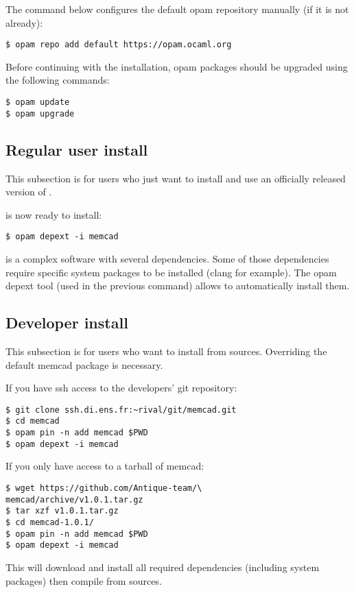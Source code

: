 The command below configures the default opam repository manually
(if it is not already):
\begin{verbatim}
$ opam repo add default https://opam.ocaml.org
\end{verbatim}

Before continuing with the installation, opam packages should be upgraded
using the following commands:
\begin{verbatim}
$ opam update
$ opam upgrade
\end{verbatim}

\subsection{Regular user install}
This subsection is for users who just want to install and use
an officially released version of \memcad.

\memcad is now ready to install:
\begin{verbatim}
$ opam depext -i memcad
\end{verbatim}

\memcad is a complex software with several dependencies.
Some of those dependencies require specific system packages
to be installed (clang for example).
The opam depext tool (used in the previous command) allows
to automatically install them.

\subsection{Developer install}
This subsection is for users who want to install \memcad from sources.
Overriding the default memcad package is necessary.

If you have ssh access to the developers' git repository:
\begin{verbatim}
$ git clone ssh.di.ens.fr:~rival/git/memcad.git
$ cd memcad
$ opam pin -n add memcad $PWD
$ opam depext -i memcad
\end{verbatim}

If you only have access to a tarball of memcad:
\begin{verbatim}
$ wget https://github.com/Antique-team/\
memcad/archive/v1.0.1.tar.gz
$ tar xzf v1.0.1.tar.gz
$ cd memcad-1.0.1/
$ opam pin -n add memcad $PWD
$ opam depext -i memcad
\end{verbatim}

This will download and install all required dependencies
(including system packages) then compile \memcad from sources.


